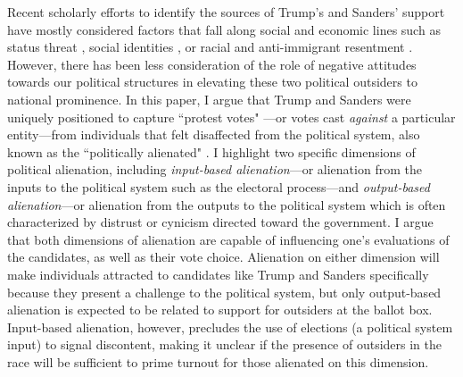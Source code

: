 \documentclass[12pt]{article}
\begin{document}
Recent scholarly efforts to identify the sources of Trump's and Sanders' support have mostly considered factors that fall along social and economic lines such as status threat \parencite{mutz2018status}, social identities \parencite{sides2018identity,mason2021activating}, or racial and anti-immigrant resentment \parencite{hooghe2018explaining,hopkins2021activation}. However, there has been less consideration of the role of negative attitudes towards our political structures in elevating these two political outsiders to national prominence. In this paper, I argue that Trump and Sanders were uniquely positioned to capture ``protest votes" \parencite{alvarez2018taxonomy,southwell1998electoral}---or votes cast \textit{against} a particular entity---from individuals that felt disaffected from the political system, also known as the ``politically alienated" \parencite{olsen1969}. I highlight two specific dimensions of political alienation, including \textit{input-based alienation}---or alienation from the inputs to the political system such as the electoral process---and \textit{output-based alienation}---or alienation from the outputs to the political system which is often characterized by distrust or cynicism directed toward the government. I argue that both dimensions of alienation are capable of influencing one's evaluations of the candidates, as well as their vote choice. Alienation on either dimension will make individuals attracted to candidates like Trump and Sanders specifically because they present a challenge to the political system, but only output-based alienation is expected to be related to support for outsiders at the ballot box. Input-based alienation, however, precludes the use of elections (a political system input) to signal discontent, making it unclear if the presence of outsiders in the race will be sufficient to prime turnout for those alienated on this dimension.
 
\end{document}
